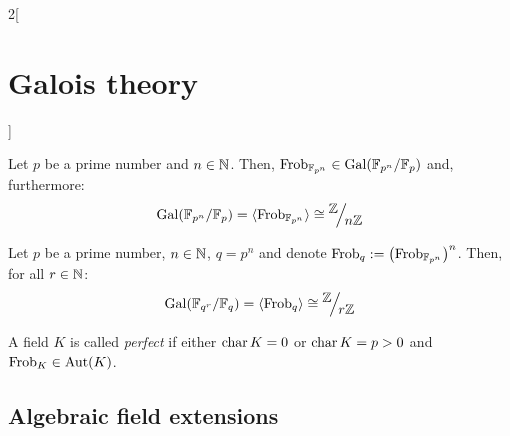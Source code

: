 \documentclass[../../../main_math.tex]{subfiles}
\begin{document}
\begin{multicols}{2}[\section{Galois theory}]
\begin{definition}
  \end{definition}
  \begin{theorem}
    Let $p$ be a prime number and $n\in\mathbb{N}$. Then, $\text{Frob}_{\mathbb{F}_{p^n}}\in\operatorname{Gal}(\mathbb{F}_{p^n}/\mathbb{F}_p)$ and, furthermore: $$\Gal(\FF_{p^n}/\FF_p)=\langle\text{Frob}_{\FF_{p^n}}\rangle\cong\quot{\ZZ}{n\ZZ}$$
  \end{theorem}
  \begin{corollary}
    Let $p$ be a prime number, $n\in\mathbb{N}$, $q=p^n$ and denote $\text{Frob}_q:={\left(\text{Frob}_{\mathbb{F}_{p^n}}\right)}^n$. Then, for all $r\in\mathbb{N}$: $$\Gal(\FF_{q^r}/\FF_q)=\langle\text{Frob}_q\rangle\cong\quot{\ZZ}{r\ZZ}$$
  \end{corollary}
  \begin{definition}
    A field $K$ is called \emph{perfect} if either $\operatorname{char} K=0$ or $\operatorname{char} K=p>0$ and $\text{Frob}_K\in\operatorname{Aut}(K)$.
  \end{definition}
  \subsection{Algebraic field extensions}

\end{multicols}
\end{document}
